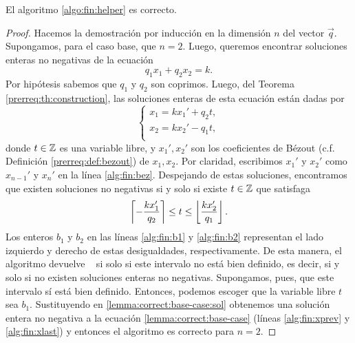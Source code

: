 \begin{theorem}
	\label{th:fin:helper:correct}
	El algoritmo \ref{algo:fin:helper} es correcto.
\end{theorem}
\begin{proof}
	Hacemos la demostración por inducción en la dimensión $n$ del vector $\vec{q}$. Supongamos, para
	el caso base, que $n = 2$. Luego, queremos encontrar soluciones enteras no negativas de la
	ecuación
	\begin{equation}
		\label{lemma:correct:base-case}
		q_1x_1 + q_2x_2 = k.
	\end{equation}
	Por hipótesis sabemos que $q_1$ y $q_2$ son coprimos. Luego, del Teorema
	\ref{prerreq:th:construction}, las soluciones enteras de esta ecuación están dadas por
	\begin{equation}
		\label{lemma:correct:base-case:sol}
		\begin{cases}
			x_1 = kx_1' + q_2t, \\
			x_2 = kx_2' - q_1t, \\
		\end{cases}
	\end{equation}
	donde $t \in \mathbb{Z}$ es una variable libre, y $x_1', x_2'$ son los coeficientes de Bézout (c.f.
	Definición \ref{prerreq:def:bezout}) de $x_1, x_2$. Por claridad, escribimos $x_1'$ y $x_2'$
	como $x_{n-1}'$ y $x_{n}'$ en la línea \ref{alg:fin:bez}. Despejando de estas soluciones,
	encontramos que existen soluciones no negativas si y solo si existe $t \in \mathbb{Z}$ que satisfaga
	\begin{equation*}
		\left\lceil -\frac{kx_1'}{q_2} \right\rceil \leq t \leq \left\lfloor \frac{kx_2'}{q_1} \right\rfloor.
	\end{equation*}
	Los enteros $b_1$ y $b_2$ en las líneas \ref{alg:fin:b1} y \eqref{alg:fin:b2} representan el
	lado izquierdo y derecho de estas desigualdades, respectivamente. De esta manera, el algoritmo
	devuelve \NIL~ si solo si este intervalo no está bien definido, es decir, si y solo si no existen
	soluciones enteras no negativas. Supongamos, pues, que este intervalo sí está bien definido.
	Entonces, podemos escoger que la variable libre $t$ sea $b_1$. Sustituyendo en
	\eqref{lemma:correct:base-case:sol} obtenemos una solución entera no negativa a la ecuación
	\eqref{lemma:correct:base-case} (líneas \ref{alg:fin:xprev} y \eqref{alg:fin:xlast}) y entonces
	el algoritmo es correcto para $n = 2$.


\end{proof}
